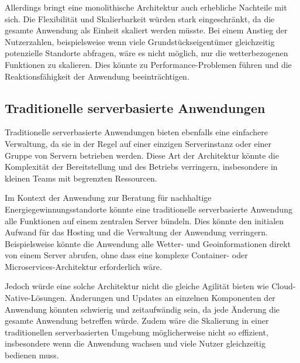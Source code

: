 Allerdings bringt eine monolithische Architektur auch erhebliche Nachteile mit sich. Die Flexibilität und Skalierbarkeit würden stark eingeschränkt, da die gesamte Anwendung als Einheit skaliert werden müsste. Bei einem Anstieg der Nutzerzahlen, beispielsweise wenn viele Grundstückseigentümer gleichzeitig potenzielle Standorte abfragen, wäre es nicht möglich, nur die wetterbezogenen Funktionen zu skalieren. Dies könnte zu Performance-Problemen führen und die Reaktionsfähigkeit der Anwendung beeinträchtigen.

\subsection{Traditionelle serverbasierte Anwendungen}
Traditionelle serverbasierte Anwendungen bieten ebenfalls eine einfachere Verwaltung, da sie in der Regel auf einer einzigen Serverinstanz oder einer Gruppe von Servern betrieben werden. Diese Art der Architektur könnte die Komplexität der Bereitstellung und des Betriebs verringern, insbesondere in kleinen Teams mit begrenzten Ressourcen.

Im Kontext der Anwendung zur Beratung für nachhaltige Energiegewinnungsstandorte könnte eine traditionelle serverbasierte Anwendung alle Funktionen auf einem zentralen Server bündeln. Dies könnte den initialen Aufwand für das Hosting und die Verwaltung der Anwendung verringern. Beispielsweise könnte die Anwendung alle Wetter- und Geoinformationen direkt von einem Server abrufen, ohne dass eine komplexe Container- oder Microservices-Architektur erforderlich wäre.

Jedoch würde eine solche Architektur nicht die gleiche Agilität bieten wie Cloud-Native-Lösungen. Änderungen und Updates an einzelnen Komponenten der Anwendung könnten schwierig und zeitaufwändig sein, da jede Änderung die gesamte Anwendung betreffen würde. Zudem wäre die Skalierung in einer traditionellen serverbasierten Umgebung möglicherweise nicht so effizient, insbesondere wenn die Anwendung wachsen und viele Nutzer gleichzeitig bedienen muss.